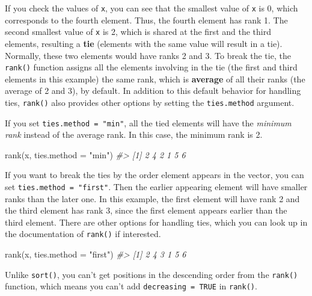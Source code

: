\documentclass[
]{book}
\newenvironment{Shaded}{\begin{snugshade}}{\end{snugshade}}
\newcommand{\AttributeTok}[1]{\textcolor[rgb]{0.77,0.63,0.00}{#1}}
\newcommand{\CommentTok}[1]{\textcolor[rgb]{0.56,0.35,0.01}{\textit{#1}}}
\newcommand{\FunctionTok}[1]{\textcolor[rgb]{0.00,0.00,0.00}{#1}}
\newcommand{\NormalTok}[1]{#1}
\newcommand{\StringTok}[1]{\textcolor[rgb]{0.31,0.60,0.02}{#1}}
\newenvironment{blackbox}{
  \definecolor{shadecolor}{rgb}{0, 0, 0}  %
  \color{white}
  \begin{shaded}}
 {\end{shaded}}
\newenvironment{infobox}[1]
  {
  \begin{itemize}
  \renewcommand{\labelitemi}{
    \raisebox{-.7\height}[0pt][0pt]{
      {\setkeys{Gin}{width=3em,keepaspectratio}
        \texttt{[image: pics/\#1]}}
    }
  }
  \setlength{\fboxsep}{1em}
  \begin{blackbox}
  \item
  }
  {
  \end{blackbox}
  \end{itemize}
  }
\begin{document}
If you check the values of \texttt{x}, you can see that the smallest value of \texttt{x} is 0, which corresponds to the fourth element. Thus, the fourth element has rank 1. The second smallest value of \texttt{x} is 2, which is shared at the first and the third elements, resulting a \textbf{tie} (elements with the same value will result in a tie). Normally, these two elements would have ranks 2 and 3. To break the tie, the \texttt{rank()} function assigns all the elements involving in the tie (the first and third elements in this example) the same rank, which is \textbf{average} of all their ranks (the average of 2 and 3), by default. In addition to this default behavior for handling ties, \texttt{rank()} also provides other options by setting the \texttt{ties.method} argument.

If you set \texttt{ties.method\ =\ "min"}, all the tied elements will have the \emph{minimum rank} instead of the average rank. In this case, the minimum rank is 2.

\begin{Shaded}
\begin{Highlighting}[]
\FunctionTok{rank}\NormalTok{(x, }\AttributeTok{ties.method =} \StringTok{"min"}\NormalTok{)}
\CommentTok{\#\textgreater{} [1] 2 4 2 1 5 6}
\end{Highlighting}
\end{Shaded}

If you want to break the ties by the order element appears in the vector, you can set \texttt{ties.method\ =\ "first"}. Then the earlier appearing element will have smaller ranks than the later one. In this example, the first element will have rank 2 and the third element has rank 3, since the first element appears earlier than the third element. There are other options for handling ties, which you can look up in the documentation of \texttt{rank()} if interested.

\begin{Shaded}
\begin{Highlighting}[]
\FunctionTok{rank}\NormalTok{(x, }\AttributeTok{ties.method =} \StringTok{"first"}\NormalTok{)}
\CommentTok{\#\textgreater{} [1] 2 4 3 1 5 6}
\end{Highlighting}
\end{Shaded}

\begin{infobox}{caution}
Unlike \texttt{sort()}, you can't get positions in the descending order from the \texttt{rank()} function, which means you can't add \texttt{decreasing\ =\ TRUE} in \texttt{rank()}.

\end{infobox}
\end{document}
